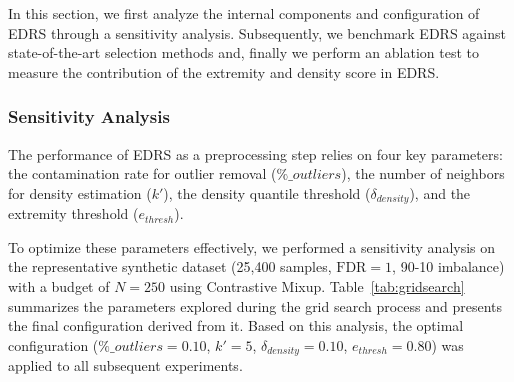 \documentclass[preprint,12pt]{elsarticle}
\begin{document}
In this section, we first analyze the internal components and configuration of EDRS through a sensitivity analysis. Subsequently, we benchmark EDRS against state-of-the-art selection methods and, finally we perform an ablation test to measure the contribution of the extremity and density score in EDRS.

\subsubsection{Sensitivity Analysis} \label{subsec:sensitivity}
The performance of EDRS as a preprocessing step relies on four key parameters: the contamination rate for outlier removal ($\%\_{outliers}$), the number of neighbors for density estimation ($k'$), the density quantile threshold ($\delta_{density}$), and the extremity threshold ($e_{thresh}$).

To optimize these parameters effectively, we performed a sensitivity analysis on the representative synthetic dataset (25,400 samples, $\text{FDR}=1$, 90-10 imbalance) with a budget of $N=250$ using Contrastive Mixup. Table~\ref{tab:gridsearch} summarizes the parameters explored during the grid search process and presents the final configuration derived from it. Based on this analysis, the optimal configuration ($\%\_{outliers}=0.10$, $k'=5$, $\delta_{density}=0.10$, $e_{thresh}=0.80$) was applied to all subsequent experiments.

\begin{table}[H]
\centering
\caption{\\ Sensitivity analysis performed on the representative synthetic dataset (25,400 samples, $\text{FDR}=1$, 90-10 imbalance).}
\label{tab:gridsearch}
\end{table}
\end{document}

